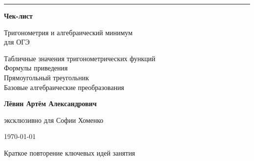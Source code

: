 \documentclass[a4paper,12pt]{article}
\begin{document}
\begin{titlepage}
\thispagestyle{empty}

\begin{center}

\vspace*{2.2cm}

{\color{accent}\rule{0.18\linewidth}{1.2pt}}

\vspace{1.1cm}

{\Huge\bfseries\color{darkaccent}
Чек-лист}

\vspace{0.45cm}

{\LARGE
Тригонометрия и алгебраический минимум\\[0.2cm]
для ОГЭ}

\vspace{1.4cm}

{\large
Табличные значения тригонометрических функций\\
Формулы приведения\\
Прямоугольный треугольник\\
Базовые алгебраические преобразования
}

\vspace{2.1cm}

{\large\bfseries
Лёвин Артём Александрович}

\vspace{0.3cm}

{\large
эксклюзивно для Софии Хоменко}

\vspace{1.3cm}

{\large \today}

\vfill


\vspace{0.35cm}

{\small\color{softgray}
Краткое повторение ключевых идей занятия
}

\end{center}
\end{titlepage}
\end{document}
